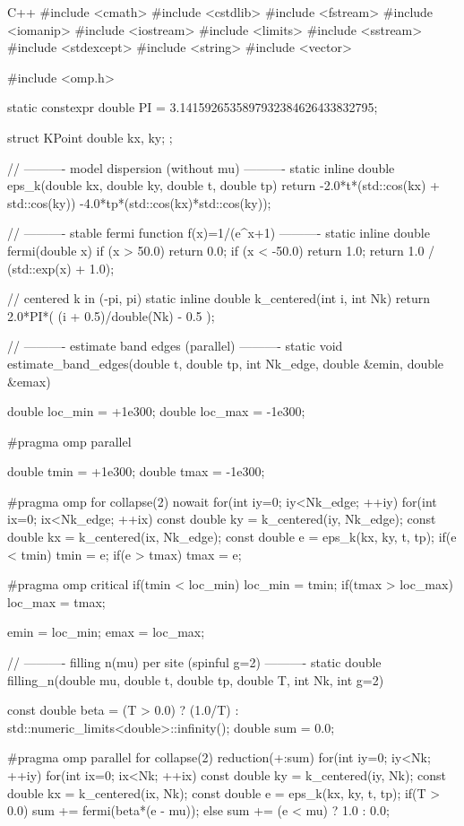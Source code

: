 \documentclass[12pt]{jreport}
\begin{document}
\begin{codebox}{C++}
#include <cmath>
#include <cstdlib>
#include <fstream>
#include <iomanip>
#include <iostream>
#include <limits>
#include <sstream>
#include <stdexcept>
#include <string>
#include <vector>

#include <omp.h>

static constexpr double PI = 3.1415926535897932384626433832795;

struct KPoint { double kx, ky; };

// ---------- model dispersion (without mu) ----------
static inline double eps_k(double kx, double ky, double t, double tp){
    return -2.0*t*(std::cos(kx) + std::cos(ky))
           -4.0*tp*(std::cos(kx)*std::cos(ky));
}

// ---------- stable fermi function f(x)=1/(e^x+1) ----------
static inline double fermi(double x){
    if (x >  50.0) return 0.0;
    if (x < -50.0) return 1.0;
    return 1.0 / (std::exp(x) + 1.0);
}

// centered k in (-pi, pi)
static inline double k_centered(int i, int Nk){
    return 2.0*PI*( (i + 0.5)/double(Nk) - 0.5 );
}

// ---------- estimate band edges (parallel) ----------
static void estimate_band_edges(double t, double tp, int Nk_edge, double &emin, double &emax){
    double loc_min = +1e300;
    double loc_max = -1e300;

#pragma omp parallel
    {
        double tmin = +1e300;
        double tmax = -1e300;

#pragma omp for collapse(2) nowait
        for(int iy=0; iy<Nk_edge; ++iy){
            for(int ix=0; ix<Nk_edge; ++ix){
                const double ky = k_centered(iy, Nk_edge);
                const double kx = k_centered(ix, Nk_edge);
                const double e  = eps_k(kx, ky, t, tp);
                if(e < tmin) tmin = e;
                if(e > tmax) tmax = e;
            }
        }

#pragma omp critical
        {
            if(tmin < loc_min) loc_min = tmin;
            if(tmax > loc_max) loc_max = tmax;
        }
    }

    emin = loc_min;
    emax = loc_max;
}

// ---------- filling n(mu) per site (spinful g=2) ----------
static double filling_n(double mu, double t, double tp, double T, int Nk, int g=2){
    const double beta = (T > 0.0) ? (1.0/T) : std::numeric_limits<double>::infinity();
    double sum = 0.0;

#pragma omp parallel for collapse(2) reduction(+:sum)
    for(int iy=0; iy<Nk; ++iy){
        for(int ix=0; ix<Nk; ++ix){
            const double ky = k_centered(iy, Nk);
            const double kx = k_centered(ix, Nk);
            const double e  = eps_k(kx, ky, t, tp);
            if(T > 0.0) sum += fermi(beta*(e - mu));
            else        sum += (e < mu) ? 1.0 : 0.0;
        }
    }

}
\end{codebox}
\end{document}

